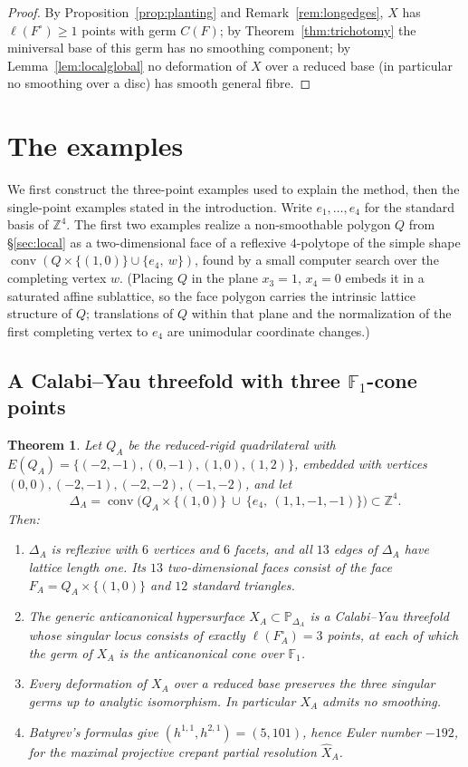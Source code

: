 \documentclass[11pt]{amsart}
\newtheorem{theorem}{Theorem}[section]
\theoremstyle{definition}
\theoremstyle{remark}
\newcommand{\ZZ}{\mathbb{Z}}
\newcommand{\PP}{\mathbb{P}}
\newcommand{\conv}{\operatorname{conv}}
\newcommand{\FF}{\mathbb{F}}
\begin{document}
\begin{proof}
By Proposition~\ref{prop:planting} and Remark~\ref{rem:longedges}, $X$ has
$\ell(F^\circ) \ge 1$ points with
germ $C(F)$; by Theorem~\ref{thm:trichotomy} the miniversal base of this germ
has no smoothing component; by Lemma~\ref{lem:localglobal} no deformation of
$X$ over a reduced base (in particular no smoothing over a disc)
has smooth general fibre.
\end{proof}

\section{The examples}\label{sec:examples}

We first construct the three-point examples used to explain the method,
then the single-point examples stated in the introduction.  Write
$e_1,\dots,e_4$ for the standard basis of $\ZZ^4$.
The first two examples realize a non-smoothable polygon $Q$ from \S\ref{sec:local} as a
two-dimensional face of a reflexive $4$-polytope of the simple shape
$\conv\left(Q \times \{(1,0)\} \cup \{e_4,\ w\}\right)$, found by a small
computer search over the completing vertex $w$.  (Placing $Q$ in the plane
$x_3=1,\,x_4=0$ embeds it in a saturated affine sublattice, so the face
polygon carries the intrinsic lattice structure of $Q$; translations of $Q$
within that plane and the normalization of the first completing vertex to
$e_4$ are unimodular coordinate changes.)

\subsection{A Calabi--Yau threefold with three \texorpdfstring{$\FF_1$}{F1}-cone points}

\begin{theorem}\label{thm:A}
Let $Q_A$ be the reduced-rigid quadrilateral with
$E(Q_A)=\{(-2,-1),\allowbreak(0,-1),\allowbreak(1,0),\allowbreak(1,2)\}$, embedded with vertices
$(0,0),(-2,-1),(-2,-2),(-1,-2)$, and let
\[
\Delta_A=\conv\bigl(Q_A\times\{(1,0)\}\ \cup\ \{e_4,\ (1,1,-1,-1)\}\bigr)
\subset \ZZ^4 .
\]
Then:
\begin{enumerate}
\item $\Delta_A$ is reflexive with $6$ vertices and $6$ facets, and all $13$
edges of $\Delta_A$ have lattice length one.  Its $13$ two-dimensional faces
consist of the face $F_A = Q_A\times\{(1,0)\}$ and $12$ standard triangles.
\item The generic anticanonical hypersurface $X_A \subset \PP_{\Delta_A}$ is a
Calabi--Yau threefold whose singular locus consists of exactly
$\ell(F_A^\circ) = 3$ points, at each of which the germ of $X_A$ is the
anticanonical cone over $\FF_1$.
\item Every deformation of $X_A$ over a reduced base preserves the
three singular germs up to analytic isomorphism.  In particular $X_A$ admits
no smoothing.
\item Batyrev's formulas give $(h^{1,1},h^{2,1}) = (5,101)$, hence Euler
number $-192$, for the maximal projective crepant partial resolution
$\widehat X_A$.
\end{enumerate}
\end{theorem}
\end{document}
